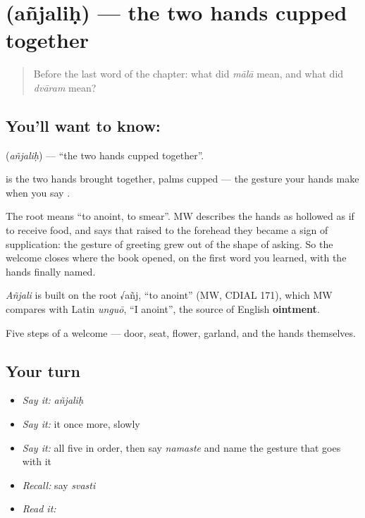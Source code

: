 \section[\texorpdfstring{\sk{अञ्जलिः} (añjaliḥ)}{अञ्जलिः (añjaliḥ)}]{ (añjaliḥ) — the two hands cupped together}

\label{lesson:SA-C30-anjali}



\begin{quote}
Before the last word of the chapter: what did \emph{mālā} mean, and what did \emph{dvāram} mean?
\end{quote}

\subsection*{You'll want to know: }
\textbf{} (\emph{añjaliḥ}) — \textquotedblleft{}the two hands cupped together\textquotedblright{}.

\textbf{} is the two hands brought together, palms cupped — the gesture your hands make when you say \textbf{}.

The root means \textquotedblleft{}to anoint, to smear\textquotedblright{}. MW describes the hands as hollowed as if to receive food, and says that raised to the forehead they became a sign of supplication: the gesture of greeting grew out of the shape of asking. So the welcome closes where the book opened, on the first word you learned, with the hands finally named.

\begin{cousinweb}
\emph{Añjali} is built on the root √añj, \textquotedblleft{}to anoint\textquotedblright{} (MW, CDIAL 171), which MW compares with Latin \emph{unguō}, \textquotedblleft{}I anoint\textquotedblright{}, the source of English \textbf{ointment}.
\end{cousinweb}

\begin{grammarlens}[title={What you've built}]
Five steps of a welcome — door, seat, flower, garland, and the hands themselves.
\end{grammarlens}

\subsection*{Your turn}
\begin{itemize}
\raggedright
  \item \emph{Say it:} \emph{añjaliḥ}
  \item \emph{Say it:} it once more, slowly
  \item \emph{Say it:} all five in order, then say \emph{namaste} and name the gesture that goes with it
  \item \emph{Recall:} say \emph{svasti}
  \item \emph{Read it:} \textbf{}
\end{itemize}

